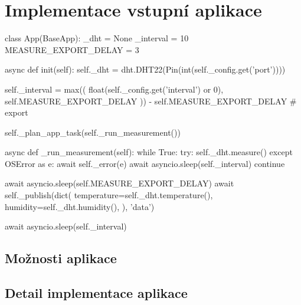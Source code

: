 \section{Implementace vstupní aplikace}\label{sec:implementace-vstupni-aplikace}
\begin{code}[
    language=Python,
    caption={Implementace vstupní aplikace pro měření teploty a vlhkosti pomocí senzoru DHT.}
]
class App(BaseApp):
    _dht = None
    _interval = 10
    MEASURE_EXPORT_DELAY = 3

    async def init(self):
        self._dht = dht.DHT22(Pin(int(self._config.get('port'))))

        self._interval = max((
            float(self._config.get('interval') or 0),
            self.MEASURE_EXPORT_DELAY
        )) - self.MEASURE_EXPORT_DELAY  # export

        self._plan_app_task(self._run_measurement())

    async def _run_measurement(self):
        while True:
            try:
                self._dht.measure()
            except OSError as e:
                await self._error(e)
                await asyncio.sleep(self._interval)
                continue

            await asyncio.sleep(self.MEASURE_EXPORT_DELAY)
            await self._publish(dict(
                temperature=self._dht.temperature(),
                humidity=self._dht.humidity(),
            ), 'data')

            await asyncio.sleep(self._interval)
\end{code}


\subsection{Možnosti aplikace}

\subsection{Detail implementace aplikace}

